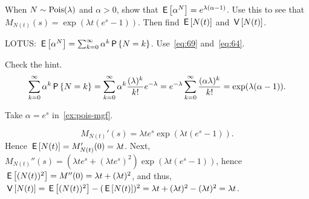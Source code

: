 \documentclass[stochastic-or.tex]{subfiles}
\begin{document}
\begin{exercise}\label{ex:pois-mgf}
When $N \sim \Pois{\lambda}$ and $\alpha > 0$, show that $\E{\alpha^{N}} = e^{\lambda(\alpha-1)}$.
Use this to see that $M_{N(t)}(s) = \exp{(\lambda t(e^s-1))}$. Then  find $\E{N(t)}$ and $\V{N(t)}$.
\begin{hint}
LOTUS: $\E{\alpha^{N}} = \sum_{k=0}^\infty \alpha^{k} \P{N=k}$. Use~\cref{eq:69} and~\cref{eq:64}.
\end{hint}
\begin{solution}
Check the hint.
\begin{align*}
\sum_{k=0}^\infty \alpha^{k} \P{N=k} = \sum_{k=0}^\infty \alpha^{k} \frac{(\lambda)^k}{k!} e^{-\lambda}
= e^{-\lambda} \sum_{k=0}^\infty \frac{(\alpha \lambda)^k}{k!} =\exp(\lambda (\alpha - 1)).
\end{align*}

Take $\alpha=e^{s}$ in~\cref{ex:pois-mgf}.

 \begin{equation*}
 M_{N(t)}'(s) = \lambda t e^s \exp(\lambda t(e^s - 1)).
 \end{equation*}
 Hence $\E{N(t)} = M_{N(t)}'(0) = \lambda t $.
Next, $M_{N(t)}''(s) = (\lambda t e^s + (\lambda t e^s)^2) \exp(\lambda t(e^s - 1))$, hence $\E{(N(t))^2} = M''(0) = \lambda t + (\lambda t)^2$, and thus, $\V{N(t)} =\E{(N(t))^2}-(\E{N(t)})^2 = \lambda t + (\lambda t)^2 - (\lambda t)^2 = \lambda t$.

\end{solution}
\end{exercise}
\end{document}
